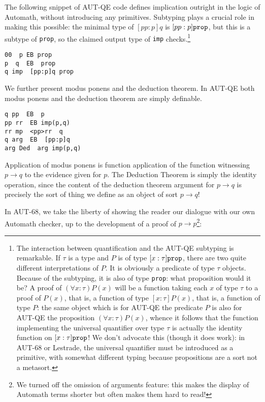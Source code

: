 \documentclass{article}
\begin{document}
The following snippet of AUT-QE code defines implication outright in the logic of Automath, without introducing any primitives.  Subtyping plays a crucial role in making this possible:  the minimal type of $[pp:p]q$ is $[pp:p]{\tt prop}$, but this is a subtype of {\tt prop}, so the claimed output  type of {\tt imp} checks.\footnote{The interaction between quantification and the AUT-QE subtyping is remarkable.  If $\tau$ is a type and $P$ is of type $[x:\tau]{\tt prop}$, there are two quite different interpretations of $P$.  It is obviously a predicate of type $\tau$ objects.  Because of the subtyping, it is also of type {\tt prop}:  what proposition would it be?  A proof of $(\forall x:\tau)P(x)$ will be a function taking each $x$ of type $\tau$ to a proof of $P(x)$, that is, a function of type $[x:\tau]P(x)$, that is, a function of type $P$:  the same object which is for AUT-QE the predicate $P$ is also for AUT-QE the proposition $(\forall x:\tau)P(x)$, whence it follows that the function implementing the universal quantifier over type $\tau$ is actually the identity function on $[x:\tau]{\tt prop}$!  We don't advocate this (though it does work):  in AUT-68 or Lestrade, the universal quantifier must be introduced as a primitive, with somewhat different typing because propositions are a sort not a metasort.}

   \begin{verbatim}
00  p EB prop
p  q  EB  prop
q imp  [pp:p]q prop
\end{verbatim}



We further present modus ponens and the deduction theorem. In AUT-QE
both modus ponens and the deduction theorem are simply definable.

   \begin{verbatim}
q pp  EB  p
pp rr  EB imp(p,q)
rr mp  <pp>rr  q
q arg  EB  [pp:p]q
arg Ded  arg imp(p,q)
\end{verbatim}

Application of modus ponens is function application of the function witnessing $p \rightarrow q$ to the evidence given for $p$.  The Deduction Theorem is simply the identity operation, since the content of the deduction theorem argument for $p \rightarrow q$ is precisely the sort of thing we define as an object of sort $p \rightarrow q$!

In AUT-68, we take the liberty of showing the reader our dialogue with our own Automath checker, up to the development of a proof of $p\rightarrow p$\footnote{We turned off the omission of arguments feature:  this makes the display of Automath terms shorter but often makes them hard to read!}:
\end{document}
